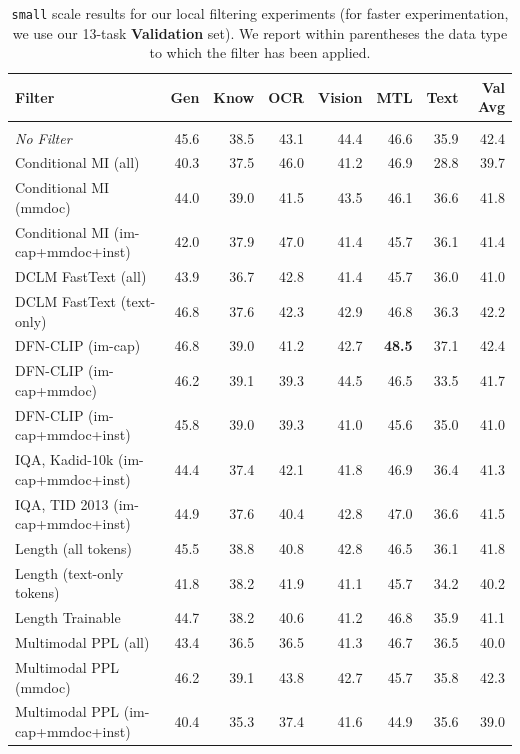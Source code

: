 \begin{table}[t]
\centering
\caption{\texttt{small} scale results for our local filtering experiments (for faster experimentation, we use our 13-task \textbf{Validation} set). We report within parentheses the data type to which the filter has been applied.}
\label{tab:local-filtering-val-small}
\small
\begin{tabular}{lrrrrrrr}
\toprule
\textbf{Filter} & \textbf{Gen} & \textbf{Know} & \textbf{OCR} & \textbf{Vision} & \textbf{MTL} & \textbf{Text} & \textbf{Val Avg} \\
\midrule
\rowcolor{gray!8} \multicolumn{8}{l}{\texttt{small} scale} \\
\midrule
\textit{No Filter} & 45.6 & 38.5 & 43.1 & 44.4 & 46.6 & 35.9 & 42.4 \\
Conditional MI (all) & 40.3 & 37.5 & 46.0 & 41.2 & 46.9 & 28.8 & 39.7 \\
Conditional MI (mmdoc) & 44.0 & 39.0 & 41.5 & 43.5 & 46.1 & 36.6 & 41.8 \\
Conditional MI (im-cap+mmdoc+inst) & 42.0 & 37.9 & 47.0 & 41.4 & 45.7 & 36.1 & 41.4 \\
DCLM FastText (all) & 43.9 & 36.7 & 42.8 & 41.4 & 45.7 & 36.0 & 41.0 \\
DCLM FastText (text-only) & 46.8 & 37.6 & 42.3 & 42.9 & 46.8 & 36.3 & 42.2 \\
DFN-CLIP (im-cap) & 46.8 & 39.0 & 41.2 & 42.7 & \textbf{48.5} & 37.1 & 42.4 \\
DFN-CLIP (im-cap+mmdoc) & 46.2 & 39.1 & 39.3 & 44.5 & 46.5 & 33.5 & 41.7 \\
DFN-CLIP (im-cap+mmdoc+inst) & 45.8 & 39.0 & 39.3 & 41.0 & 45.6 & 35.0 & 41.0 \\
IQA, Kadid-10k (im-cap+mmdoc+inst) & 44.4 & 37.4 & 42.1 & 41.8 & 46.9 & 36.4 & 41.3 \\
IQA, TID 2013 (im-cap+mmdoc+inst) & 44.9 & 37.6 & 40.4 & 42.8 & 47.0 & 36.6 & 41.5 \\
Length (all tokens) & 45.5 & 38.8 & 40.8 & 42.8 & 46.5 & 36.1 & 41.8 \\
Length (text-only tokens) & 41.8 & 38.2 & 41.9 & 41.1 & 45.7 & 34.2 & 40.2 \\
Length Trainable & 44.7 & 38.2 & 40.6 & 41.2 & 46.8 & 35.9 & 41.1 \\
Multimodal PPL (all) & 43.4 & 36.5 & 36.5 & 41.3 & 46.7 & 36.5 & 40.0 \\
Multimodal PPL (mmdoc) & 46.2 & 39.1 & 43.8 & 42.7 & 45.7 & 35.8 & 42.3 \\
Multimodal PPL (im-cap+mmdoc+inst) & 40.4 & 35.3 & 37.4 & 41.6 & 44.9 & 35.6 & 39.0 \\

\end{tabular}
\end{table}
